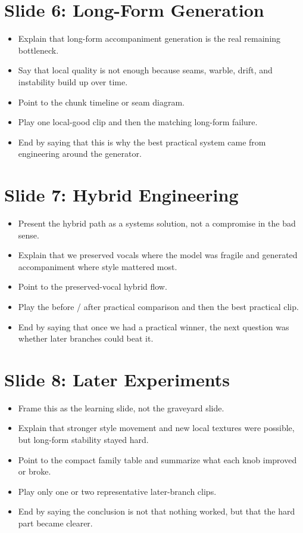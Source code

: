 \documentclass[11pt]{article}
\begin{document}
\section*{Slide 6: Long-Form Generation}
\begin{itemize}
\item Explain that long-form accompaniment generation is the real remaining bottleneck.
\item Say that local quality is not enough because seams, warble, drift, and instability build up over time.
\item Point to the chunk timeline or seam diagram.
\item Play one local-good clip and then the matching long-form failure.
\item End by saying that this is why the best practical system came from engineering around the generator.
\end{itemize}

\section*{Slide 7: Hybrid Engineering}
\begin{itemize}
\item Present the hybrid path as a systems solution, not a compromise in the bad sense.
\item Explain that we preserved vocals where the model was fragile and generated accompaniment where style mattered most.
\item Point to the preserved-vocal hybrid flow.
\item Play the before / after practical comparison and then the best practical clip.
\item End by saying that once we had a practical winner, the next question was whether later branches could beat it.
\end{itemize}

\section*{Slide 8: Later Experiments}
\begin{itemize}
\item Frame this as the learning slide, not the graveyard slide.
\item Explain that stronger style movement and new local textures were possible, but long-form stability stayed hard.
\item Point to the compact family table and summarize what each knob improved or broke.
\item Play only one or two representative later-branch clips.
\item End by saying the conclusion is not that nothing worked, but that the hard part became clearer.
\end{itemize}
\end{document}
